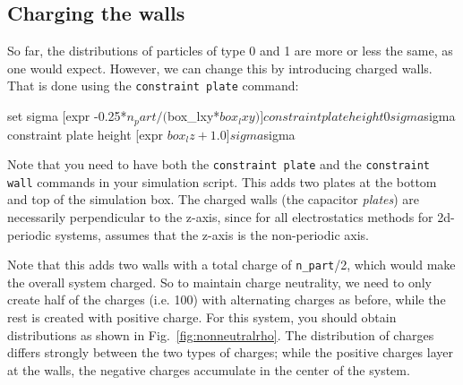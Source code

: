 \documentclass[
a4paper,                        %
11pt,                           %
twoside,                        %
footsepline,                    %
headsepline,                    %
headexclude,                    %
footexclude,                    %
pagesize,                       %
]{scrartcl}
\begin{document}
\subsection*{Charging the walls}

So far, the distributions of particles of type 0 and 1 are more or
less the same, as one would expect. However, we can change this by
introducing charged walls. That is done using the
\verb|constraint plate| command:

\begin{tclcode}
  set sigma [expr -0.25*$n_part/($box_lxy*$box_lxy)]
  constraint plate height 0 sigma $sigma
  constraint plate height [expr $box_lz + 1.0] sigma $sigma
\end{tclcode}

Note that you need to have both the \verb|constraint plate| and the 
\verb|constraint wall| commands in your simulation script.
This adds two plates at the bottom and top of the simulation box. The
charged walls (the capacitor \emph{plates}) are necessarily
perpendicular to the z-axis, since for all electrostatics methods for
2d-periodic systems, \es{} assumes that the z-axis is the
non-periodic axis.

Note that
this adds two walls with a total charge of \verb|n_part|/2, which
would make the overall system charged. So to maintain charge
neutrality, we need to only create half of the charges (i.e. 100)
with alternating charges as before, while the rest is created
with positive charge.
For this system, you should obtain distributions as shown in
Fig.~\ref{fig:nonneutralrho}. The distribution of charges differs
strongly between the two types of charges; while the positive charges
layer at the walls, the negative charges accumulate in the center of
the system.
\end{document}
